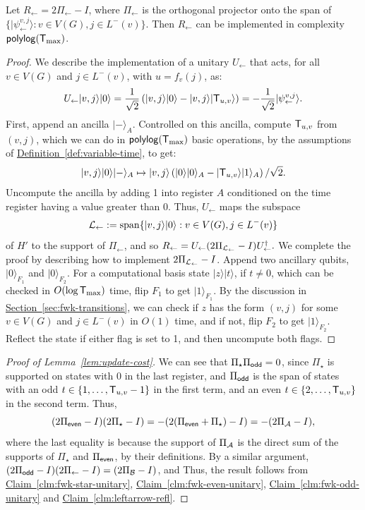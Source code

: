 \documentclass{article}
\renewcommand{\sec}[1]{\hyperref[sec:#1]{Section~\ref*{sec:#1}}}
\newcommand{\defin}[1]{\hyperref[def:#1]{Definition~\ref*{def:#1}}}
\newcommand{\clm}[1]{\hyperref[clm:#1]{Claim~\ref*{clm:#1}}}
\def\ket#1{{\lvert}#1\rangle}
\renewcommand{\>}{\rangle}
\newcommand{\<}{\langle}
\renewcommand{\(}{\left(}
\renewcommand{\)}{\right)}
\begin{document}
\begin{claim}\label{clm:leftarrow-refl}
Let $R_{\leftarrow} =2\Pi_{\leftarrow}-I$, where $\Pi_{\leftarrow}$ is the orthogonal projector onto the span of
$\{\ket{\psi_{\leftarrow}^{v,j}}:v\in V(G),j\in L^-(v)\}.$
Then $R_{\leftarrow}$ can be implemented in complexity ${\sf polylog}({\sf T}_{\max})$. 
\end{claim}
\begin{proof}
We describe the implementation of a unitary $U_{\leftarrow}$ that acts, for all $v\in V(G)$ and $j\in L^-(v)$, with $u=f_v(j)$, as:
$$U_{\leftarrow}\ket{v,j}\ket{0} = \frac{1}{\sqrt{2}}\left(
	\ket{v,j}\ket{0}-\ket{v,j}\ket{{\sf T}_{u,v}}
\right)
=-\frac{1}{\sqrt{2}}\ket{\psi_{\leftarrow}^{v,j}}.$$
First, append an ancilla $\ket{-}_A$. Controlled on this ancilla, compute ${\sf T}_{u,v}$ from $(v,j)$, which we can do in ${\sf polylog}({\sf T}_{\max})$ basic operations, by the assumptions of \defin{variable-time}, to get:
$$\ket{v,j}\ket{0}\ket{-}_A \mapsto \ket{v,j}\left(\ket{0}\ket{0}_A - \ket{{\sf T}_{u,v}}\ket{1}_A\right)/\sqrt{2}.$$
Uncompute the ancilla by adding 1 into register $A$ conditioned on the time register having a value greater than 0. Thus, $U_{\leftarrow}$ maps the subspace
$${\cal L}_{\leftarrow}:=\mathrm{span}\{\ket{v,j}\ket{0}:v\in V(G), j\in L^-(v)\}$$
of $H'$ to the support of $\Pi_{\leftarrow}$, and so
$R_{\leftarrow} = U_{\leftarrow}(2\Pi_{{\cal L}_\leftarrow}-I)U_{\leftarrow}^\dagger.$
We complete the proof by describing how to implement $2\Pi_{{\cal L}_\leftarrow}-I$. Append two ancillary qubits, $\ket{0}_{F_1}$ and $\ket{0}_{F_2}$. For a computational basis state $\ket{z}\ket{t}$, if $t\neq 0$, which can be checked in $O(\log {\sf T}_{\max})$ time, flip $F_1$ to get $\ket{1}_{F_1}$. By the discussion in \sec{fwk-transitions}, we can check if $z$ has the form $(v,j)$ for some $v\in V(G)$ and $j\in L^-(v)$ in $O(1)$ time, and if not, flip $F_2$ to get $\ket{1}_{F_2}$. Reflect the state if either flag is set to 1, and then uncompute both flags.
\end{proof}


\begin{proof}[Proof of Lemma~\ref{lem:update-cost}]
We can see that $\Pi_\star\Pi_{\sf odd}=0$, since $\Pi_\star$ is supported on states with $0$ in the last register, and $\Pi_{\sf odd}$ is the span of states with an odd $t\in \{1,\dots,{\sf T}_{u,v}-1\}$ in the first term, and an even $t\in\{2,\dots,{\sf T}_{u,v}\}$ in the second term. Thus, 
$$(2\Pi_{\sf even}-I)(2\Pi_\star-I)=-(2(\Pi_{\sf even}+\Pi_\star)-I) = -(2\Pi_{\cal A}-I),$$
where the last equality is because the support of $\Pi_{\cal A}$ is the direct sum of the supports of $\Pi_\star$ and $\Pi_{\sf even}$, by their definitions. 
By a similar argument, $(2\Pi_{\sf odd}-I)(2\Pi_{\leftarrow}-I)=(2\Pi_{\cal B}-I)$, and Thus, the result follows from \clm{fwk-star-unitary}, \clm{fwk-even-unitary}, \clm{fwk-odd-unitary} and \clm{leftarrow-refl}.
\end{proof}
\end{document}
